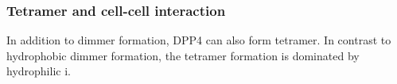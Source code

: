 \subsubsection{Tetramer and cell-cell interaction}

In addition to dimmer formation, DPP4 can also form tetramer. In contrast to hydrophobic dimmer formation, the tetramer formation is dominated by hydrophilic i.~\cite{Engel_2003} 